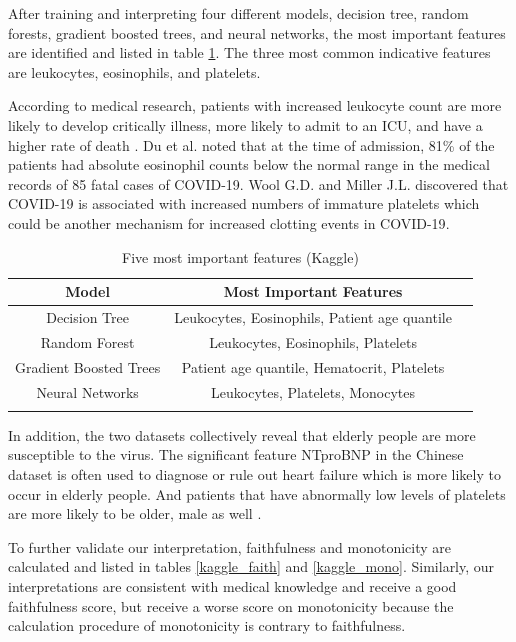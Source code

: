 After training and interpreting four different models, decision tree, random forests, gradient boosted trees, and neural networks, the most important features are identified and listed in table \ref{tab:important_feature_kaggle}. The three most common indicative features are leukocytes, eosinophils, and platelets.

According to medical research, patients with increased leukocyte count are more likely to develop critically illness, more likely to admit to an ICU, and have a higher rate of death \citep{zhao2020clinical}. Du et al. noted that at the time of admission, 81\% of the patients had absolute eosinophil counts below the normal range in the medical records of 85 fatal cases of COVID-19\citep{du2020clinical}. Wool G.D. and Miller J.L. discovered that COVID-19 is associated with increased numbers of immature platelets which could be another mechanism for increased clotting events in COVID-19\citep{wool2021impact}.

\begin{table}[H]
\centering
\caption{Five most important features (Kaggle)}
\begin{tabular}{@{}ccc@{}}
\toprule
Model                   & Most Important Features \\ \midrule
Decision Tree           & Leukocytes, Eosinophils, Patient age quantile      \\
Random Forest           & Leukocytes, Eosinophils, Platelets        \\
Gradient Boosted Trees  & Patient age quantile, Hematocrit, Platelets  \\
Neural Networks         & Leukocytes, Platelets, Monocytes          \\  \bottomrule
\label{tab:important_feature_kaggle}
\end{tabular}
\end{table}

In addition, the two datasets collectively reveal that elderly people are more susceptible to the virus. The significant feature NTproBNP in the Chinese dataset is often used to diagnose or rule out heart failure which is more likely to occur in elderly people. And patients that have abnormally low levels of platelets are more likely to be older, male as well \citep{wool2021impact}.
\color{black}

To further validate our interpretation, faithfulness and monotonicity are calculated and listed in tables \ref{kaggle_faith} and \ref{kaggle_mono}. Similarly, our interpretations are consistent with medical knowledge and receive a good faithfulness score, but receive a worse score on monotonicity because the calculation procedure of monotonicity is contrary to faithfulness.

